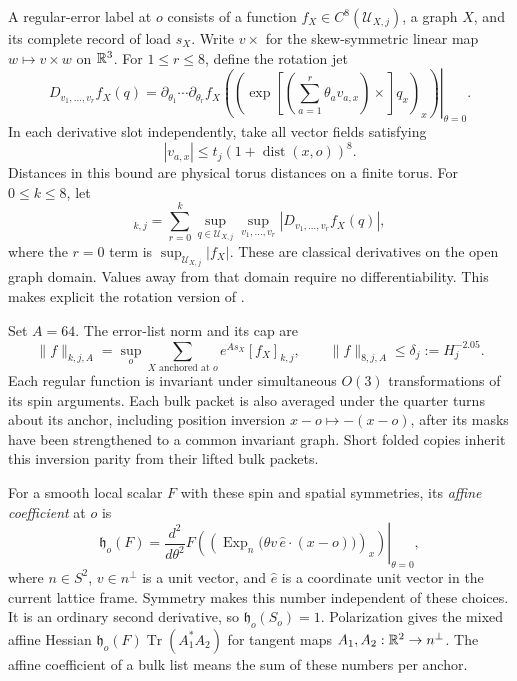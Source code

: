 A regular-error label at $o$ consists of a function
$f_X\in C^8(\mathcal U_{X,j})$, a graph $X$, and its complete record of
load $s_X$.  Write $v\times$ for the skew-symmetric linear map
$w\mapsto v\times w$ on $\mathbb R^3$.  For $1\le r\le8$, define the rotation
jet
\begin{equation}
 D_{v_1,\ldots,v_r}f_X(q)
 =\left.
  \partial_{\theta_1}\cdots\partial_{\theta_r}
  f_X\left(\left(
    \exp\!\left[\left(\sum_{a=1}^r\theta_av_{a,x}\right)\times\right]
                     q_x\right)_x\right)
 \right|_{\theta=0}.
 \label{eq:setup-error-jets}
\end{equation}
In each derivative slot independently, take all vector fields satisfying
\begin{equation}
 |v_{a,x}|\le t_j(1+\operatorname{dist}(x,o))^8.
 \label{eq:setup-error-directions}
\end{equation}
Distances in this bound are physical torus distances on a finite torus.
For $0\le k\le8$, let
\begin{equation}
 [f_X]_{k,j}
 =\sum_{r=0}^k
   \sup_{q\in\mathcal U_{X,j}}
   \sup_{v_1,\ldots,v_r}
       |D_{v_1,\ldots,v_r}f_X(q)|,
 \label{eq:setup-error-seminorm}
\end{equation}
where the $r=0$ term is $\sup_{\mathcal U_{X,j}}|f_X|$.
These are classical derivatives on the open graph domain.  Values away
from that domain require no differentiability.  This makes explicit the
rotation version of .

Set $A=64$.  The error-list norm and its cap are
\begin{equation}
 \|f\|_{k,j,A}
   =\sup_o\sum_{X\text{ anchored at }o}e^{As_X}[f_X]_{k,j},
 \qquad
 \|f\|_{8,j,A}\le\delta_j:=H_j^{-2.05}.
 \label{eq:setup-error-list-norm}
\end{equation}
Each regular function is invariant under simultaneous $O(3)$
transformations of its spin arguments.  Each bulk packet is also
averaged under the quarter turns about its anchor, including position
inversion $x-o\mapsto-(x-o)$, after its masks have been strengthened to
a common invariant graph.  Short folded copies inherit this inversion
parity from their lifted bulk packets.

For a smooth local scalar $F$ with these spin and spatial symmetries,
its \emph{affine coefficient} at $o$ is
\begin{equation}
 \mathfrak h_o(F)=
 \left.\frac{d^2}{d\theta^2}
 F\left(\left(\operatorname{Exp}_n
       \bigl(\theta v\,\widehat e\cdot(x-o)\bigr)\right)_x\right)
 \right|_{\theta=0},
 \label{eq:setup-affine-coefficient}
\end{equation}
where $n\in S^2$, $v\in n^\perp$ is a unit vector, and $\widehat e$ is
a coordinate unit vector in the current lattice frame.  Symmetry makes
this number independent of these choices.  It is an ordinary second
derivative, so $\mathfrak h_o(S_o)=1$.  Polarization gives the mixed
affine Hessian
$\mathfrak h_o(F)\operatorname{Tr}(A_1^*A_2)$ for tangent maps
$A_1,A_2:\mathbb R^2\to n^\perp$.  The affine coefficient of a bulk list means
the sum of these numbers per anchor.

